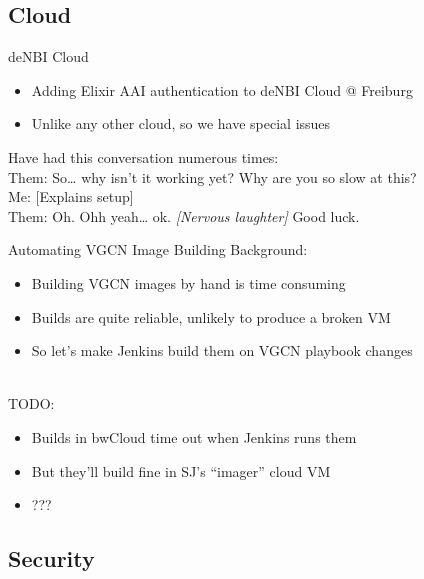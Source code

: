 \documentclass[12pt]{ufrslides}
\begin{document}
\subsection{Cloud}

	\begin{frame}{deNBI Cloud}
		\begin{itemize}
			\item Adding Elixir AAI authentication to deNBI Cloud @ Freiburg
			\item Unlike any other cloud, so we have special issues
		\end{itemize}
		Have had this conversation numerous times:\\[0.5cm]

		\quad Them: So\ldots{} why isn't it working yet? Why are you so slow at this? \\
		\quad Me: [Explains setup] \\
		\quad Them: Oh. Ohh yeah\ldots{} ok. \textit{[Nervous laughter]} Good luck. \\
	\end{frame}

	\begin{frame}{Automating VGCN Image Building}
		Background:
		\begin{itemize}
			\item Building VGCN images by hand is time consuming
			\item Builds are quite reliable, unlikely to produce a broken VM
			\item So let's make Jenkins build them on VGCN playbook changes
		\end{itemize}
		\ \\[0.5cm]
		TODO:
		\begin{itemize}
			\item Builds in bwCloud time out when Jenkins runs them
			\item But they'll build fine in SJ's ``imager'' cloud VM
			\item ???
		\end{itemize}
	\end{frame}

\subsection{Security}
\end{document}
